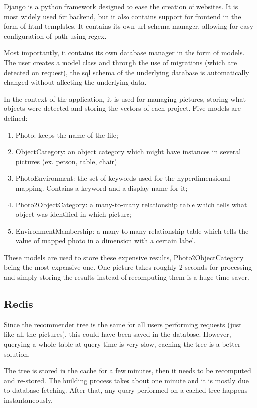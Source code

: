 Django is a python framework designed to ease the creation of websites. It is most widely used for backend, but it also contains support for frontend in the form of html templates. It contains its own url schema manager, allowing for easy configuration of path using regex.

Most importantly, it contains its own database manager in the form of models. The user creates a model class and through the use of migrations (which are detected on request), the sql schema of the underlying database is automatically changed without affecting the underlying data.

In the context of the application, it is used for managing pictures, storing what objects were detected and storing the vectors of each project. Five models are defined:

\begin{enumerate}
\item{Photo: keeps the name of the file;}
\item{ObjectCategory: an object category which might have instances in several pictures (ex. person, table, chair)}
\item{PhotoEnvironment: the set of keywords used for the hyperdimensional mapping. Contains a keyword and a display name for it;}
\item{Photo2ObjectCategory: a many-to-many relationship table which tells what object was identified in which picture;}
\item{EnvironmentMembership: a many-to-many relationship table which tells the value of mapped photo in a dimension with a certain label.}
\end{enumerate}

These models are used to store these expensive results, Photo2ObjectCategory being the most expensive one. One picture takes roughly 2 seconds for processing and simply storing the results instead of recomputing them is a huge time saver.

\subsection{Redis}
\label{subsec:app_architecture_redis}

Since the recommender tree is the same for all users performing requests (just like all the pictures), this could have been saved in the database. However, querying a whole table at query time is very slow, caching the tree is a better solution. 

The tree is stored in the cache for a few minutes, then it needs to be recomputed and re-stored. The building process takes about one minute and it is mostly due to database fetching. After that, any query performed on a cached tree happens instantaneously.

